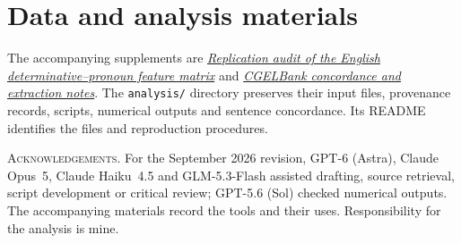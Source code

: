 \documentclass[12pt]{article}
\begin{document}
\section*{Data and analysis materials}

The accompanying supplements are \href{run:matrix-audit.pdf}{\textit{Replication audit of the English determinative--pronoun feature matrix}} and \href{run:corpus-documentation.pdf}{\textit{CGELBank concordance and extraction notes}}. The \texttt{analysis/} directory preserves their input files, provenance records, scripts, numerical outputs and sentence concordance. Its README identifies the files and reproduction procedures.

\vspace{0.5\baselineskip}
\noindent\textsc{Acknowledgements.} For the September 2026 revision, GPT-6 (Astra), Claude Opus~5, Claude Haiku~4.5 and GLM-5.3-Flash assisted drafting, source retrieval, script development or critical review; GPT-5.6 (Sol) checked numerical outputs. The accompanying materials record the tools and their uses. Responsibility for the analysis is mine.

\clearpage
\printbibliography
\end{document}
